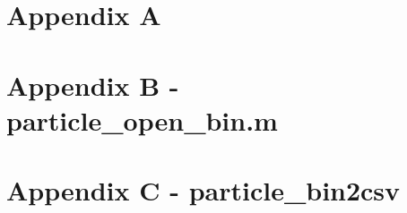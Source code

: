 \documentclass[12pt,letterpaper,titlepage]{article}
\begin{document}

\pagebreak
\appendix
%

\section{Appendix A}
\label{app: particle_sinking}


\section{Appendix B - particle\_open\_bin.m}
\label{app: particle_open_bin}

\pagebreak

\section{Appendix C - particle\_bin2csv}
\label{app: particle_bin2csv}


\pagebreak
\glsaddall				%
\renewcommand*{\arraystretch}{0.3}%
\printglossaries
\end{document}
